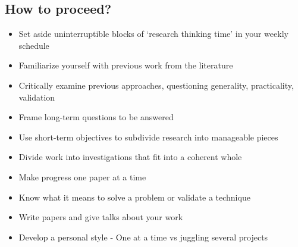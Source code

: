 \subsection{How to proceed?}

\begin{itemize}
  \item Set aside uninterruptible blocks of `research thinking time' in your weekly schedule
  \item Familiarize yourself with previous work from the literature
  \item Critically examine previous approaches, questioning generality, practicality, validation
  \item Frame long-term questions to be answered
  \item Use short-term objectives to subdivide research into manageable pieces
  \item Divide work into investigations that fit into a coherent whole
  \item Make progress one paper at a time
  \item Know what it means to solve a problem or validate a technique
  \item Write papers and give talks about your work
  \item Develop a personal style -  One at a time vs juggling several projects
\end{itemize}


